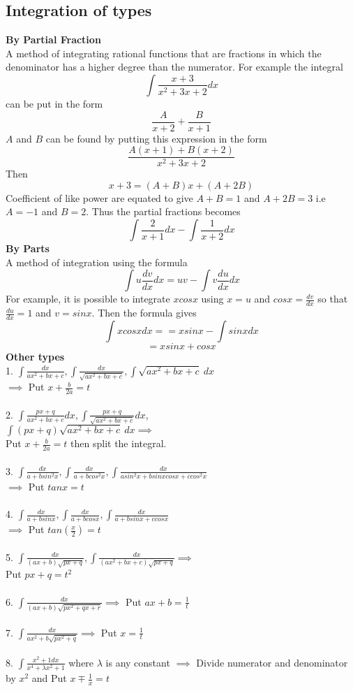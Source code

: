 \documentclass[12pt]{article}
\begin{document}
\subsection{Integration of types}
\textbf{By Partial Fraction} \\
A method of integrating rational functions that are fractions in which the denominator has a higher degree than the numerator. For example
the integral $$\int \frac{x+3}{x^2+3x+2}dx$$
can be put in the form $$\frac{A}{x+2} +\frac{B}{x+1}$$
$A$ and $B$ can be found by putting this expression in the form $$\frac{A(x+1)+B(x+2)}{x^2+3x+2}$$ Then $$x+3=(A+B)x+(A+2B)$$ Coefficient of like power are equated to give $A+B=1$ and $A+2B=3$ i.e $A=-1$ and $B=2$. Thus the partial fractions becomes $$\int \frac{2}{x+1}dx - \int \frac{1}{x+2}dx$$
\textbf{By Parts} \\
A method of integration using the formula $$\int u \frac{dv}{dx}dx=uv-\int v \frac{du}{dx}dx$$ For example, it is possible to integrate $xcosx$ using $x=u$ and $cosx = \frac{dv}{dx}$ so that $\frac{du}{dx}=1$
and $v=sinx.$ Then the formula gives $$\int xcosxdx==xsinx- \int sinxdx$$ $$=xsinx+cosx$$
\textbf{Other types}\\
1. $\int \frac{dx}{ax^2+bx+c},\int \frac{dx}{\sqrt{ax^2+bx+c}},\int \sqrt{ax^2+bx+c} \medspace dx$\\ $\implies$ Put $x+\frac{b}{2a}=t$\\ \\
2. $\int \frac{px+q}{ax^2+bx+c}dx,\int \frac{px+q}{\sqrt{ax^2+bx+c}}dx$,\\$\int(px+q)\sqrt{ax^2+bx+c} \medspace dx \implies$ \\
Put $x+\frac{b}{2a}=t$ then split the integral. \\ \\
3. $\int \frac{dx}{a+bsin^2x}, \int \frac{dx}{a+bcos^2x},\int \frac{dx}{asin^2x+bsinxcosx+ccos^2x}$ \\
$\implies$ Put $tanx=t$ \\ \\
4. $\int \frac{dx}{a+bsinx}, \int \frac{dx}{a+bcosx},\int \frac{dx}{a+bsinx+ccosx}$ \\
$\implies$ Put $tan(\frac{x}{2})=t$ \\ \\
5. $\int \frac{dx}{(ax+b)\sqrt{px+q}},\int \frac{dx}{(ax^2+bx+c)\sqrt{px+q}} \implies$ \\
Put $px+q=t^2$ \\\\
6. $\int \frac{dx}{(ax+b)\sqrt{px^2+qx+r}} \implies$ Put $ax+b=\frac{1}{t}$ \\\\
7. $\int \frac{dx}{ax^2+b\sqrt{px^2+q}} \implies$ Put $x=\frac{1}{t}$ \\\\
8. $\int \frac{x^2+1dx}{x^4+\lambda x^2+1}$ where $\lambda$ is any constant $\implies$ Divide numerator and denominator by $x^2$ and Put $x \mp \frac{1}{x}=t$
\end{document}
